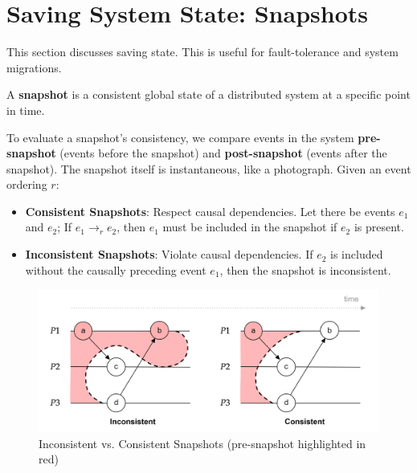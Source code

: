 \section{Saving System State: Snapshots}

\label{sec:snap}
This section discusses saving state. This is useful for fault-tolerance and system migrations.

\begin{Def}[Snapshot]

    A \textbf{snapshot} is a consistent global state of a distributed system at a specific point in time. 
\end{Def}

\begin{Def}

    To evaluate a snapshot's consistency, we compare events in the system \textbf{pre-snapshot} (events before the snapshot) 
    and \textbf{post-snapshot} (events after the snapshot). The snapshot itself is instantaneous, like a photograph. 
    Given an event ordering $r$:
    
    \begin{itemize}
        \item \textbf{Consistent Snapshots}: Respect causal dependencies. Let there be events $e_1$ and $e_2$; If $e_1 \rightarrow_r e_2$, then $e_1$ must be included in the snapshot if $e_2$ is present.
        \item \textbf{Inconsistent Snapshots}: Violate causal dependencies. If $e_2$ is included without 
        the causally preceding event $e_1$, then the snapshot is inconsistent.
    \end{itemize}
\end{Def}

\vspace{-1em}
\begin{figure}[h]
    \centering
    \includegraphics[width=.9\textwidth]{Sections/snap/snap.png}
    \caption{Inconsistent vs. Consistent Snapshots (pre-snapshot highlighted in red)}
\end{figure}

